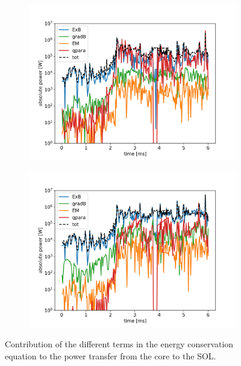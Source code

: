 \begin{figure}[H]\centering
	\begin{subfigure}[t]{0.45\textwidth}
		\centering
		\includegraphics[width=1\textwidth]{schemes/heatflux_comp_sepc_spec0.jpg}
		\label{fig:TCV_decompHeatFluxFlutter_electron}
	\end{subfigure}
	\begin{subfigure}[t]{0.45\textwidth}
		\centering
		\includegraphics[width=1\textwidth]{schemes/heatflux_comp_sepc_spec1.jpg}
		\label{fig:TCV_decompHeatFluxFlutter_ion}
	\end{subfigure}
	\caption{Contribution of the different terms in the energy conservation equation to the power transfer from the core to the SOL.}
	\label{fig:TCV_decompHeatFluxFlutter}
\end{figure}





